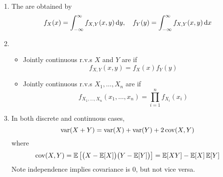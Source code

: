 \documentclass{styles/note}
\begin{document}
\begin{enumerate}[label=(\alph*)]
    \item The  are obtained by
      \begin{equation}
        f_X(x) = \int_{-\infty}^\infty f_{X, Y}(x, y) \dif y, \quad f_Y(y) = \int_{-\infty}^\infty f_{X, Y}(x, y) \dif x
      \end{equation}
    
    \item
      \begin{itemize}[leftmargin=1em]
        \item Jointly continuous r.v.s $X$ and $Y$ are  if
          \begin{equation}
            f_{X, Y}(x, y) = f_X(x) f_Y(y)
          \end{equation}
        \item Jointly continuous r.v.s $X_1, \dots, X_n$ are  if
          \begin{equation}
            f_{X_1, \dots, X_n}(x_1, \dots, x_n) = \prod_{i=1}^n f_{X_i}(x_i)
          \end{equation}
      \end{itemize}
    
    \item In both discrete and continuous cases,
      \begin{equation}
        \operatorname{var}(X + Y) = \operatorname{var}(X) + \operatorname{var}(Y) + 2\operatorname{cov}(X, Y)
      \end{equation}
      where
      \begin{equation}
        \covar(X, Y) = \expectation\big[\left(X - \expectation[X]\right) \left(Y - \expectation[Y]\right)\big] = \expectation[XY] - \expectation[X]\expectation[Y]
      \end{equation}
      Note independence implies covariance is 0, but not vice versa.
  \end{enumerate}
  
\end{document}
